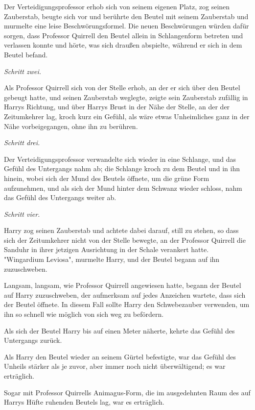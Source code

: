 {Der Verteidigungsprofessor erhob sich von seinem eigenen Platz, zog seinen Zauberstab, beugte sich vor und berührte den Beutel mit seinem Zauberstab und murmelte eine leise Beschwörungsformel. Die neuen Beschwörungen würden dafür sorgen, dass Professor Quirrell den Beutel allein in Schlangenform betreten und verlassen konnte und hörte, was sich draußen abspielte, während er sich in dem Beutel befand.

\emph{Schritt zwei.}

Als Professor Quirrell sich von der Stelle erhob, an der er sich über den Beutel gebeugt hatte, und seinen Zauberstab weglegte, zeigte sein Zauberstab zufällig in Harrys Richtung, und über Harrys Brust in der Nähe der Stelle, an der der Zeitumkehrer lag, kroch kurz ein Gefühl, als wäre etwas Unheimliches ganz in der Nähe vorbeigegangen, ohne ihn zu berühren.

\emph{Schritt drei.}

Der Verteidigungsprofessor verwandelte sich wieder in eine Schlange, und das Gefühl des Untergangs nahm ab; die Schlange kroch zu dem Beutel und in ihn hinein, wobei sich der Mund des Beutels öffnete, um die grüne Form aufzunehmen, und als sich der Mund hinter dem Schwanz wieder schloss, nahm das Gefühl des Untergangs weiter ab.

\emph{Schritt vier.}

Harry zog seinen Zauberstab und achtete dabei darauf, still zu stehen, so dass sich der Zeitumkehrer nicht von der Stelle bewegte, an der Professor Quirrell die Sanduhr in ihrer jetzigen Ausrichtung in der Schale verankert hatte. "Wingardium Leviosa", murmelte Harry, und der Beutel begann auf ihn zuzuschweben.

Langsam, langsam, wie Professor Quirrell angewiesen hatte, begann der Beutel auf Harry zuzuschweben, der aufmerksam auf jedes Anzeichen wartete, dass sich der Beutel öffnete. In diesem Fall sollte Harry den Schwebezauber verwenden, um ihn so schnell wie möglich von sich weg zu befördern.

Als sich der Beutel Harry bis auf einen Meter näherte, kehrte das Gefühl des Untergangs zurück.

Als Harry den Beutel wieder an seinem Gürtel befestigte, war das Gefühl des Unheils stärker als je zuvor, aber immer noch nicht überwältigend; es war erträglich.

Sogar mit Professor Quirrells Animagus-Form, die im ausgedehnten Raum des auf Harrys Hüfte ruhenden Beutels lag, war es erträglich.

}
